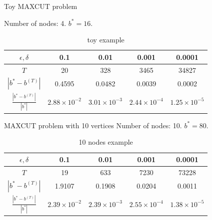 \documentclass{beamer}
\begin{document}
\begin{frame}{Toy MAXCUT problem}

Number of nodes: 4. $b^* = 16$.

\begin{table}[htbp]\label{toytable}
\centering\small
\begin{tabular}{||c|c|c|c|c||}
\hline
$\epsilon, \delta$ & 0.1 & 0.01 & 0.001 & 0.0001 \\
\hline
$T$ & 20 & 328 & 3465  & 34827 \\
\hline
$|b^* - b^{(T)}|$ & 0.4595 & 0.0482 & 0.0039 & 0.0002 \\
\hline 
$\frac{|b^* - b^{(T)}|}{|b^*|}$ & $2.88\times 10^{-2}$ &  $3.01\times 10^{-3}$  & $2.44\times 10^{-4}$ &  $1.25\times 10^{-5}$\\
\hline
\end{tabular}
\caption{toy example}
\end{table}
\end{frame}

\begin{frame}{MAXCUT problem with 10 vertices}
Number of nodes: 10. $b^* = 80$. 
\begin{table}[htbp]\label{10nodestable}
\centering\small

\begin{tabular}{||c|c|c|c|c||}
\hline
$\epsilon, \delta$ & 0.1 & 0.01 & 0.001 & 0.0001 \\
\hline
$T$ & 19 & 633 & 7230 & 73228 \\
\hline
$|b^* - b^{(T)}|$ & 1.9107 & 0.1908 & 0.0204 & 0.0011 \\
\hline
$\frac{|b^* - b^{(T)}|}{|b^*|}$ & $2.39\times 10^{-2}$ &  $2.39\times 10^{-3}$  & $2.55\times 10^{-4}$ &  $1.38\times 10^{-5}$\\
\hline
\end{tabular}
\caption{10 nodes example}
\end{table}
\end{frame}
\end{document}
